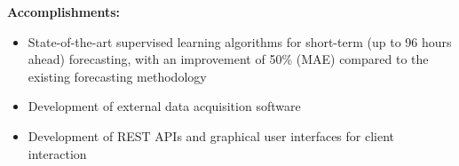 \documentclass{mycv}
\begin{document}
\begin{myitemize}
		\vspace{0.15cm}
		\textbf{Accomplishments:}
		
		\begin{itemize}[itemsep=1px]
			\item State-of-the-art supervised learning algorithms for short-term (up to 96 hours ahead) forecasting, with an improvement of 50\% (MAE) compared to the existing forecasting methodology
			\item Development of external data acquisition software
			\item Development of REST APIs and graphical user interfaces for client interaction
		\end{itemize}
		
\end{myitemize}	

\vspace{0.15cm}	
\end{document}
